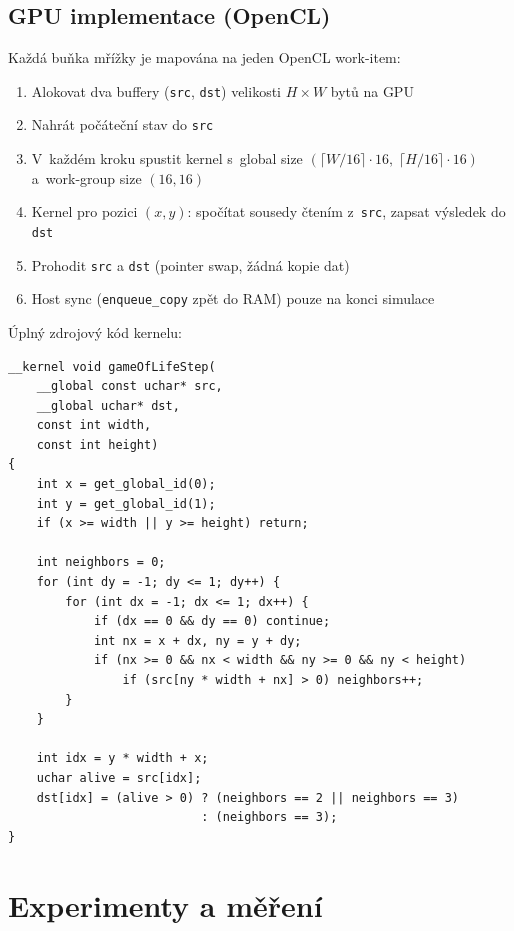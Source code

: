 \documentclass[12pt,a4paper]{article}
\begin{document}
\subsection{GPU implementace (OpenCL)}

Každá buňka mřížky je mapována na jeden OpenCL work-item:

\begin{enumerate}
    \item Alokovat dva buffery (\texttt{src}, \texttt{dst}) velikosti $H \times W$ bytů na GPU
    \item Nahrát počáteční stav do \texttt{src}
    \item V~každém kroku spustit kernel s~global size $(\lceil W/16 \rceil \cdot 16,\; \lceil H/16 \rceil \cdot 16)$ a~work-group size $(16, 16)$
    \item Kernel pro pozici $(x, y)$: spočítat sousedy čtením z~\texttt{src}, zapsat výsledek do \texttt{dst}
    \item Prohodit \texttt{src} a \texttt{dst} (pointer swap, žádná kopie dat)
    \item Host sync (\texttt{enqueue\_copy} zpět do RAM) pouze na konci simulace
\end{enumerate}

\noindent Úplný zdrojový kód kernelu:

\begin{lstlisting}[caption={OpenCL kernel --- gameOfLife.cl}]
__kernel void gameOfLifeStep(
    __global const uchar* src,
    __global uchar* dst,
    const int width,
    const int height)
{
    int x = get_global_id(0);
    int y = get_global_id(1);
    if (x >= width || y >= height) return;

    int neighbors = 0;
    for (int dy = -1; dy <= 1; dy++) {
        for (int dx = -1; dx <= 1; dx++) {
            if (dx == 0 && dy == 0) continue;
            int nx = x + dx, ny = y + dy;
            if (nx >= 0 && nx < width && ny >= 0 && ny < height)
                if (src[ny * width + nx] > 0) neighbors++;
        }
    }

    int idx = y * width + x;
    uchar alive = src[idx];
    dst[idx] = (alive > 0) ? (neighbors == 2 || neighbors == 3)
                           : (neighbors == 3);
}
\end{lstlisting}

\section{Experimenty a měření}
\end{document}
